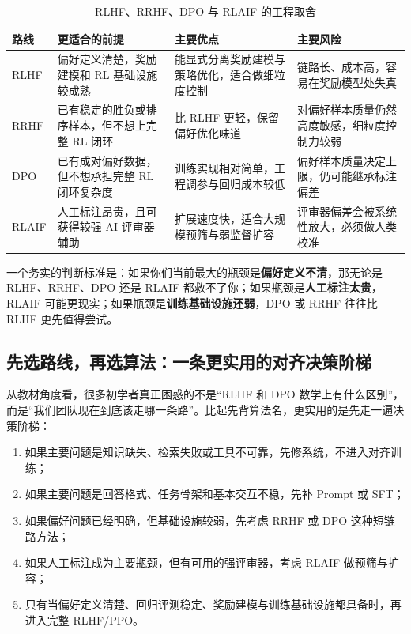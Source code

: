 \begin{table}[H]
\centering
\small
\begin{tabularx}{\textwidth}{>{\raggedright\arraybackslash}p{2.4cm}>{\raggedright\arraybackslash}p{3.2cm}>{\raggedright\arraybackslash}p{3.4cm}>{\raggedright\arraybackslash}X}
\toprule
\textbf{路线} & \textbf{更适合的前提} & \textbf{主要优点} & \textbf{主要风险} \\
\midrule
RLHF & 偏好定义清楚，奖励建模和 RL 基础设施较成熟 & 能显式分离奖励建模与策略优化，适合做细粒度控制 & 链路长、成本高，容易在奖励模型处失真 \\
RRHF & 已有稳定的胜负或排序样本，但不想上完整 RL 闭环 & 比 RLHF 更轻，保留偏好优化味道 & 对偏好样本质量仍然高度敏感，细粒度控制力较弱 \\
DPO & 已有成对偏好数据，但不想承担完整 RL 闭环复杂度 & 训练实现相对简单，工程调参与回归成本较低 & 偏好样本质量决定上限，仍可能继承标注偏差 \\
RLAIF & 人工标注昂贵，且可获得较强 AI 评审器辅助 & 扩展速度快，适合大规模预筛与弱监督扩容 & 评审器偏差会被系统性放大，必须做人类校准 \\
\bottomrule
\end{tabularx}
\caption{RLHF、RRHF、DPO 与 RLAIF 的工程取舍}
\label{tab:alignment-alternatives}
\end{table}

一个务实的判断标准是：如果你们当前最大的瓶颈是\textbf{偏好定义不清}，那无论是 RLHF、RRHF、DPO 还是 RLAIF 都救不了你；如果瓶颈是\textbf{人工标注太贵}，RLAIF 可能更现实；如果瓶颈是\textbf{训练基础设施还弱}，DPO 或 RRHF 往往比 RLHF 更先值得尝试。

\subsection{先选路线，再选算法：一条更实用的对齐决策阶梯}
从教材角度看，很多初学者真正困惑的不是“RLHF 和 DPO 数学上有什么区别”，而是“我们团队现在到底该走哪一条路”。比起先背算法名，更实用的是先走一遍决策阶梯：
\begin{enumerate}
  \item 如果主要问题是知识缺失、检索失败或工具不可靠，先修系统，不进入对齐训练；
  \item 如果主要问题是回答格式、任务骨架和基本交互不稳，先补 Prompt 或 SFT；
  \item 如果偏好问题已经明确，但基础设施较弱，先考虑 RRHF 或 DPO 这种短链路方法；
  \item 如果人工标注成为主要瓶颈，但有可用的强评审器，考虑 RLAIF 做预筛与扩容；
  \item 只有当偏好定义清楚、回归评测稳定、奖励建模与训练基础设施都具备时，再进入完整 RLHF/PPO。
\end{enumerate}

